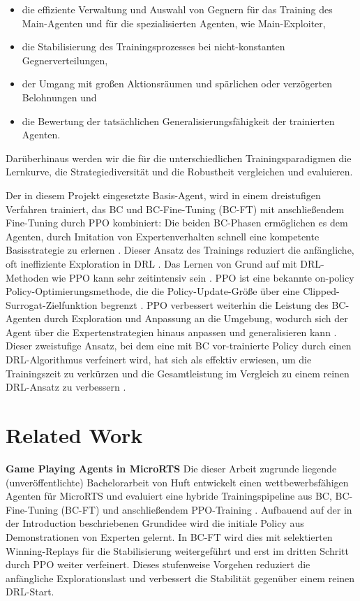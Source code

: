 \documentclass[10pt,twocolumn,letterpaper]{article}
\begin{document}
\begin{itemize}
    \item die effiziente Verwaltung und Auswahl von Gegnern für das Training des Main-Agenten und für die spezialisierten Agenten, wie Main-Exploiter,
    \item die Stabilisierung des Trainingsprozesses bei nicht-konstanten Gegnerverteilungen,
    \item der Umgang mit großen Aktionsräumen und spärlichen oder verzögerten Belohnungen und
    \item die Bewertung der tatsächlichen Generalisierungsfähigkeit der trainierten Agenten.
\end{itemize}

Darüberhinaus werden wir die für die unterschiedlichen Trainingsparadigmen die Lernkurve, die Strategiediversität und die Robustheit vergleichen und evaluieren.

Der in diesem Projekt eingesetzte Basis-Agent, wird in einem dreistufigen Verfahren trainiert, das BC und BC-Fine-Tuning (BC-FT) mit anschließendem Fine-Tuning durch PPO kombiniert: 
Die beiden BC-Phasen ermöglichen es dem Agenten, durch Imitation von Expertenverhalten schnell eine kompetente Basisstrategie zu erlernen \cite{torabi2018behavioral}. Dieser Ansatz des Trainings reduziert die anfängliche, oft ineffiziente Exploration in DRL \cite{torabi2018behavioral}. Das Lernen von Grund auf mit DRL-Methoden wie PPO kann sehr zeitintensiv sein \cite{martin2021beclone}. PPO ist eine bekannte on-policy Policy-Optimierungsmethode, die die Policy-Update-Größe über eine Clipped-Surrogat-Zielfunktion begrenzt \cite{schulman2017ppo}.
PPO verbessert weiterhin die Leistung des BC-Agenten durch Exploration und Anpassung an die Umgebung, wodurch sich der Agent über die Expertenstrategien hinaus anpassen und generalisieren kann \cite{martin2021beclone}. Dieser zweistufige Ansatz, bei dem eine mit BC vor-trainierte Policy durch einen DRL-Algorithmus verfeinert wird, hat sich als effektiv erwiesen, um die Trainingszeit zu verkürzen und die Gesamtleistung im Vergleich zu einem reinen DRL-Ansatz zu verbessern \cite{martin2021beclone}.





\section{Related Work}
\label{sec:related-work}
\noindent\textbf{Game Playing Agents in MicroRTS}
Die dieser Arbeit zugrunde liegende (unveröffentlichte) Bachelorarbeit von Huft entwickelt einen wettbewerbsfähigen Agenten für MicroRTS und evaluiert eine hybride Trainingspipeline aus BC, BC-Fine-Tuning (BC-FT) und anschließendem PPO-Training \cite{huft2023microrts}. Aufbauend auf der in der Introduction beschriebenen Grundidee wird die initiale Policy aus Demonstrationen von Experten gelernt. In BC-FT wird dies mit selektierten Winning-Replays für die Stabilisierung weitergeführt und erst im dritten Schritt durch PPO weiter verfeinert. Dieses stufenweise Vorgehen reduziert die anfängliche Explorationslast und verbessert die Stabilität gegenüber einem reinen DRL-Start.
\end{document}
